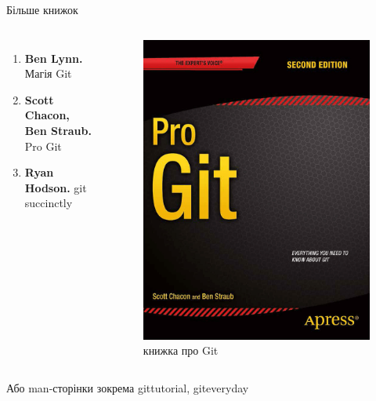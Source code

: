 \documentclass[
  ignorenonframetext,
  aspectratio=169,
]{beamer}
\begin{document}
\begin{frame}{Більше книжок}
\protect\hypertarget{ux431ux456ux43bux44cux448ux435-ux43aux43dux438ux436ux43eux43a}{}
\begin{columns}
    \begin{enumerate}
        \item \textbf{Ben Lynn.} Магія Git
        \item \textbf{Scott Chacon, Ben Straub.} Pro Git
        \item \textbf{Ryan Hodson.} git succinctly
    \end{enumerate}
    \begin{figure}
        \includegraphics[width=.6\textwidth]{images/image_proxy.png}
        \caption{книжка про Git}
    \end{figure}
\end{columns}

\begin{block}{Або man-сторінки}
\protect\hypertarget{ux430ux431ux43e-man-ux441ux442ux43eux440ux456ux43dux43aux438}{}
зокрема gittutorial, giteveryday
\end{block}
\end{frame}
\end{document}
